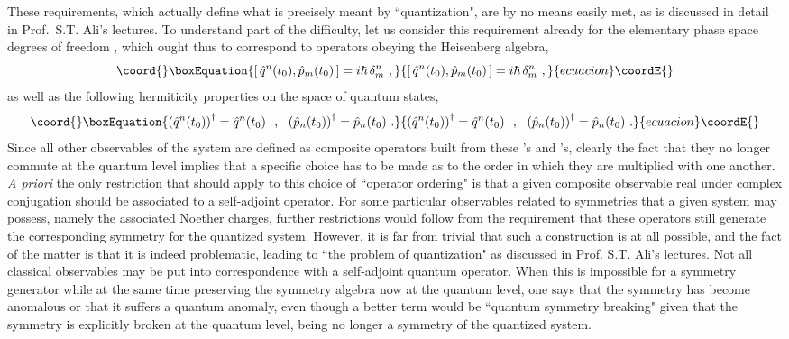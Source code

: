 \documentclass[a4paper,11pt]{article}
\begin{document}
These requirements, which actually define what is precisely
meant by ``quantization", are by no means easily met, as is discussed
in detail in Prof.~S.T. Ali's lectures. To understand part of the
difficulty, let us consider this requirement already for the
elementary phase space degrees of freedom \coordHE{}, which ought
thus to correspond to operators \coordHE{} obeying the
Heisenberg algebra,
\begin{equation}\coord{}\boxEquation{[\,\hat{q}^n(t_0),\hat{p}_m(t_0)\,]=i\hbar\,\delta^n_m\ ,
}{[\,\hat{q}^n(t_0),\hat{p}_m(t_0)\,]=i\hbar\,\delta^n_m\ ,
}{ecuacion}\coordE{}\end{equation}
as well as the following hermiticity properties on the space of quantum states,
\begin{equation}\coord{}\boxEquation{
\left(\hat{q}^n(t_0)\right)^\dagger=\hat{q}^n(t_0)\ \ ,\ \ 
\left(\hat{p}_n(t_0)\right)^\dagger=\hat{p}_n(t_0)\ .
}{
\left(\hat{q}^n(t_0)\right)^\dagger=\hat{q}^n(t_0)\ \ ,\ \ 
\left(\hat{p}_n(t_0)\right)^\dagger=\hat{p}_n(t_0)\ .
}{ecuacion}\coordE{}\end{equation}
Since all other observables of the system are defined as
composite operators built from these \coordHE{}'s and \coordHE{}'s,
clearly the fact that they no longer commute at the quantum level
implies that a specific choice has to be made as to the order in which
they are multiplied with one another. {\sl A priori\/} the only restriction
that should apply to this choice of ``operator ordering" is that a given
composite observable real under complex conjugation
should be associated to a self-adjoint operator. For some
particular observables related to symmetries that a given system may
possess, namely the associated Noether charges,
further restrictions would follow from the requirement that
these operators still generate the corresponding symmetry for the
quantized system. However, it is far from trivial that such a construction
is at all possible, and the fact of the matter is that it is indeed
problematic, leading to ``the problem of quantization" as discussed
in Prof. S.T. Ali's lectures. Not all classical observables may be
put into correspondence with a self-adjoint quantum operator.
When this is impossible for a symmetry generator while at the same time
preserving the symmetry algebra now at the quantum level, one says that 
the symmetry has become anomalous or that it suffers a quantum anomaly, 
even though a better term would be ``quantum symmetry breaking" given that 
the symmetry is explicitly broken at the quantum level, being no longer 
a symmetry of the quantized system. 
\end{document}
